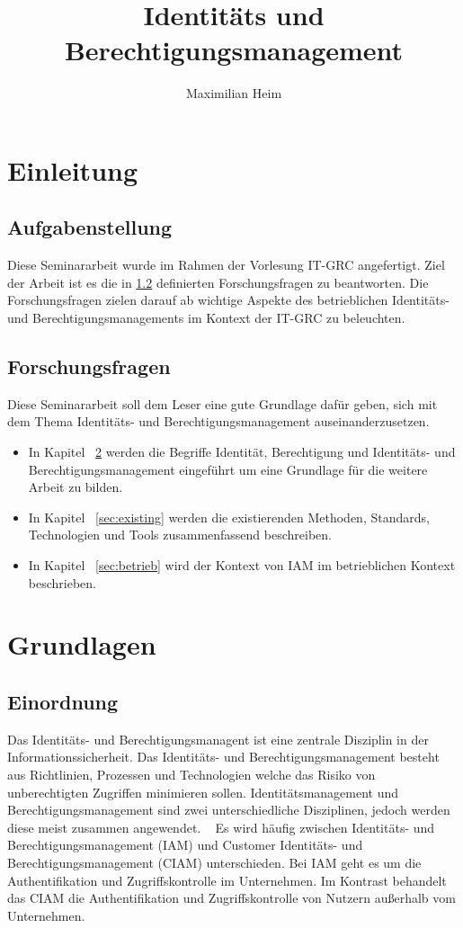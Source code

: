 \documentclass[11pt]{article}
\author{Maximilian Heim}
\title{Identitäts und Berechtigungsmanagement}
\begin{document}
\maketitle
\newpage
\tableofcontents
\newpage
\section{Einleitung}
\subsection{Aufgabenstellung}
Diese Seminararbeit wurde im Rahmen der Vorlesung IT-GRC angefertigt. Ziel der Arbeit ist es die in \cref{subsec:forschungsfragen} definierten Forschungsfragen zu beantworten. Die Forschungsfragen zielen darauf ab wichtige Aspekte des betrieblichen Identitäts- und Berechtigungsmanagements im Kontext der IT-GRC zu beleuchten.
\subsection{Forschungsfragen}
\label{subsec:forschungsfragen}
Diese Seminararbeit soll dem Leser eine gute Grundlage dafür geben, sich mit dem Thema Identitäts- und Berechtigungsmanagement auseinanderzusetzen.
\begin{itemize}
  \item In Kapitel ~\cref{sec:grundlagen} werden die Begriffe Identität, Berechtigung und Identitäts- und Berechtigungsmanagement eingeführt um eine Grundlage für die weitere Arbeit zu bilden.
  \item In Kapitel ~\cref{sec:existing} werden die existierenden Methoden, Standards, Technologien und Tools zusammenfassend beschreiben.
  \item In Kapitel ~\cref{sec:betrieb} wird der Kontext von IAM im betrieblichen Kontext beschrieben.
\end{itemize}
\section{Grundlagen}
\label{sec:grundlagen}
\subsection{Einordnung}
Das Identitäts- und Berechtigungsmanagent ist eine zentrale Disziplin in der Informationssicherheit. Das Identitäts- und Berechtigungsmanagement besteht aus Richtlinien, Prozessen und Technologien welche das Risiko von unberechtigten Zugriffen minimieren sollen. Identitätsmanagement und Berechtigungsmanagement sind zwei unterschiedliche Disziplinen, jedoch werden diese meist zusammen angewendet. ~\cite{mohammed2017systematic} Es wird häufig zwischen Identitäts- und Berechtigungsmanagement (IAM) und Customer Identitäts- und Berechtigungsmanagement (CIAM) unterschieden. Bei IAM geht es um die Authentifikation und Zugriffskontrolle im Unternehmen. Im Kontrast behandelt das CIAM die Authentifikation und Zugriffskontrolle von Nutzern außerhalb vom Unternehmen.~\cite{mohammed2017systematic} ~\cite{liveretos2022customer}
\end{document}
